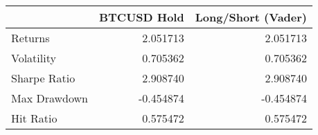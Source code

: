 \begin{tabular}{lrr}
\toprule
{} &  BTCUSD Hold &  Long/Short (Vader) \\
\midrule
Returns      &     2.051713 &            2.051713 \\
Volatility   &     0.705362 &            0.705362 \\
Sharpe Ratio &     2.908740 &            2.908740 \\
Max Drawdown &    -0.454874 &           -0.454874 \\
Hit Ratio    &     0.575472 &            0.575472 \\
\bottomrule
\end{tabular}
